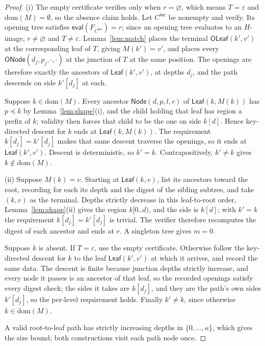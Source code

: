 \documentclass[twocolumn]{article}
\begin{document}
\begin{proof}
(i) The empty certificate verifies only when $r=\varnothing$, which means $T=\varepsilon$ and $\mathrm{dom}(M)=\emptyset$, so the absence claim holds. Let $C^\mathsf{inc}$ be nonempty and verify. Its opening tree satisfies $\mathsf{eval}(F_{C^\mathsf{inc}})=r$; since an opening tree evaluates to an $H$-image, $r\neq\varnothing$ and $T\neq\varepsilon$. Lemma~\ref{lem:match} places the terminal $\mathsf{OLeaf}(k',v')$ at the corresponding leaf of $T$, giving $M(k')=v'$, and places every $\mathsf{ONode}(d_j,p_j,\cdot,\cdot)$ at the junction of $T$ at the same position. The openings are therefore exactly the ancestors of $\mathsf{Leaf}(k',v')$, at depths $d_j$, and the path descends on side $k'[d_j]$ at each.

Suppose $k\in\mathrm{dom}(M)$. Every ancestor $\mathsf{Node}(d,p,l,r)$ of $\mathsf{Leaf}(k,M(k))$ has $p\preceq k$ by Lemma~\ref{lem:shape}(i), and the child holding that leaf has region a prefix of $k$; validity then forces that child to be the one on side $k[d]$. Hence key-directed descent for $k$ ends at $\mathsf{Leaf}(k,M(k))$. The requirement $k[d_j]=k'[d_j]$ makes that same descent traverse the openings, so it ends at $\mathsf{Leaf}(k',v')$. Descent is deterministic, so $k'=k$. Contrapositively, $k'\neq k$ gives $k\notin\mathrm{dom}(M)$.

(ii) Suppose $M(k)=v$. Starting at $\mathsf{Leaf}(k,v)$, list its ancestors toward the root, recording for each its depth and the digest of the sibling subtree, and take $(k,v)$ as the terminal. Depths strictly decrease in this leaf-to-root order, Lemma~\ref{lem:shape}(ii) gives the region $k[0..d)$, and the side is $k[d]$; with $k'=k$ the requirement $k[d_j]=k'[d_j]$ is trivial. The verifier therefore recomputes the digest of each ancestor and ends at $r$. A singleton tree gives $m=0$.

Suppose $k$ is absent. If $T=\varepsilon$, use the empty certificate. Otherwise follow the key-directed descent for $k$ to the leaf $\mathsf{Leaf}(k',v')$ at which it arrives, and record the same data. The descent is finite because junction depths strictly increase, and every node it passes is an ancestor of that leaf, so the recorded openings satisfy every digest check; the sides it takes are $k[d_j]$, and they are the path's own sides $k'[d_j]$, so the per-level requirement holds. Finally $k'\neq k$, since otherwise $k\in\mathrm{dom}(M)$.

A valid root-to-leaf path has strictly increasing depths in $\{0,\ldots,\kappa\}$, which gives the size bound; both constructions visit each path node once.
\end{proof}
\end{document}

